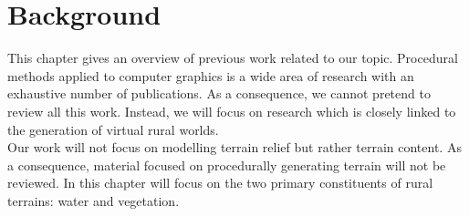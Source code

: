 
\chapter{Background} \label{chap:background}

This chapter gives an overview of previous work related to our topic. Procedural methods applied to computer graphics is a wide area of research with an exhaustive number of publications. As a consequence, we cannot pretend to review all this work. Instead, we will focus on research which is closely linked to the generation of virtual rural worlds. \\

Our work will not focus on modelling terrain relief but rather terrain content. As a consequence, material focused on procedurally generating terrain will not be reviewed. In this chapter will focus on the two primary constituents of rural terrains: water and vegetation.